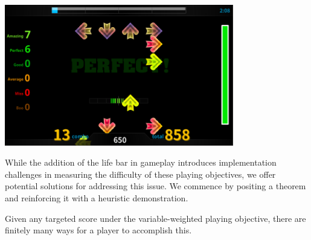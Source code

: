 \begin{center}
\includegraphics[width=10cm]{reports/figures/images/gameplay.png}
\label{fig:gameplay}
\end{center}

While the addition of the life bar in gameplay introduces implementation challenges in measuring the difficulty of these playing objectives, we offer potential solutions for addressing this issue. We commence by positing a theorem and reinforcing it with a heuristic demonstration.

\begin{theorem}
\label{thm:finiteness}
Given any targeted score under the variable-weighted playing objective, there are finitely many ways for a player to accomplish this. 
\end{theorem}

